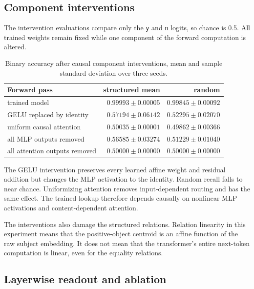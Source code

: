 \documentclass[11pt]{article}
\providecommand{\enote}[2]{}
\begin{document}
\subsection{Component interventions}

The intervention evaluations compare only the \texttt{y} and \texttt{n}
logits, so chance is 0.5.  All trained weights remain fixed while one component
of the forward computation is altered.

\begin{table}[tbp]
\centering
\begin{tabular}{lrr}
\toprule
Forward pass & structured mean & random\\
\midrule
trained model & $0.99993\pm0.00005$ & $0.99845\pm0.00092$\\
GELU replaced by identity & $0.57194\pm0.06142$ & $0.52295\pm0.02070$\\
uniform causal attention & $0.50035\pm0.00001$ & $0.49862\pm0.00366$\\
all MLP outputs removed & $0.56585\pm0.03274$ & $0.51229\pm0.01040$\\
all attention outputs removed & $0.50000\pm0.00000$ & $0.50000\pm0.00000$\\
\bottomrule
\end{tabular}
\caption{Binary accuracy after causal component interventions, mean and sample
standard deviation over three seeds.}
\label{tab:raw-transformer-ablation}
\end{table}

The GELU intervention preserves every learned affine weight and residual
addition but changes the MLP activation to the identity.  Random recall falls
to near chance.  Uniformizing attention removes input-dependent routing and has
the same effect.  The trained lookup therefore depends causally on nonlinear
MLP activations and content-dependent attention.

The interventions also damage the structured relations.  Relation linearity
in this experiment means that the positive-object centroid is an affine
function of the raw subject embedding.  It does not mean that the transformer's
entire next-token computation is linear, even for the equality relations.
\enote{hs}{so the ``nonlinear'' relation is both linear and nonlinear? can we
really argue that this is counterexample to Merullo, Smith, Wiegreffe, Elazar?}

\subsection{Layerwise readout and ablation}
\end{document}
